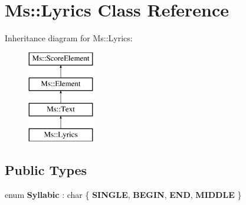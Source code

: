 \hypertarget{class_ms_1_1_lyrics}{}\section{Ms\+:\+:Lyrics Class Reference}
\label{class_ms_1_1_lyrics}
Inheritance diagram for Ms\+:\+:Lyrics\+:\begin{figure}[H]
\begin{center}
\leavevmode
\includegraphics[height=4.000000cm]{class_ms_1_1_lyrics}
\end{center}
\end{figure}
\subsection*{Public Types}
\begin{DoxyCompactItemize}
\item 
\mbox{\label{class_ms_1_1_lyrics_a45529c72fd6e06fc97d136ffb62e8ab1}} 
enum {\bfseries Syllabic} \+: char \{ {\bfseries S\+I\+N\+G\+LE}, 
{\bfseries B\+E\+G\+IN}, 
{\bfseries E\+ND}, 
{\bfseries M\+I\+D\+D\+LE}
 \}
\end{DoxyCompactItemize}

